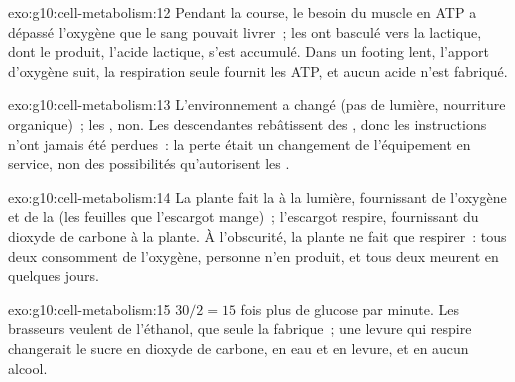 \begin{solution}{exo:g10:cell-metabolism:12}
Pendant la course, le besoin du muscle en ATP a dépassé l'oxygène que
le sang pouvait livrer~; les  ont basculé vers la 
lactique, dont le produit, l'acide lactique, s'est accumulé. Dans un
footing lent, l'apport d'oxygène suit, la respiration seule fournit
les ATP, et aucun acide n'est fabriqué.
\end{solution}

\begin{solution}{exo:g10:cell-metabolism:13}
L'environnement a changé (pas de lumière, nourriture organique)~; les
, non. Les descendantes rebâtissent des , donc les
instructions n'ont jamais été perdues~: la perte était un changement de
l'équipement en service, non des possibilités qu'autorisent les .
\end{solution}

\begin{solution}{exo:g10:cell-metabolism:14}
La plante fait la  à la lumière, fournissant de l'oxygène
et de la  (les feuilles que l'escargot mange)~;
l'escargot respire, fournissant du dioxyde de carbone à la plante. À
l'obscurité, la plante ne fait que respirer~: tous deux consomment de
l'oxygène, personne n'en produit, et tous deux meurent en quelques
jours.
\end{solution}

\begin{solution}{exo:g10:cell-metabolism:15}
$30/2 = 15$ fois plus de glucose par minute. Les brasseurs veulent de
l'éthanol, que seule la  fabrique~; une levure qui respire
changerait le sucre en dioxyde de carbone, en eau et en levure, et en
aucun alcool.
\end{solution}

